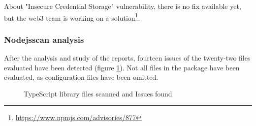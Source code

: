 \documentclass[a4paper, 12pt]{article} %
\begin{document}
                About "Insecure Credential Storage" vulnerability, there is no fix available yet, but the web3 team is working on a solution\footnote{\url{https://www.npmjs.com/advisories/877}}.
                
            \subsubsection{Nodejsscan analysis}
                After the analysis and study of the reports, fourteen issues of the twenty-two files evaluated have been detected (figure \ref{fig:pie-files}). Not all files in the package have been evaluated, as configuration files have been omitted.\\
                      
                \begin{figure}[h!]
                    \centering
                    \caption{TypeScript library files scanned and Issues found}
                    \label{fig:pie-files}
                \end{figure}
                
\end{document}
